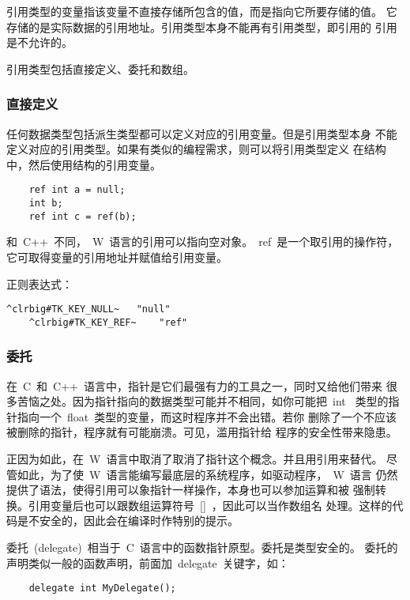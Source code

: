 引用类型的变量指该变量不直接存储所包含的值，而是指向它所要存储的值。
它存储的是实际数据的引用地址。引用类型本身不能再有引用类型，即引用的
引用是不允许的。

引用类型包括直接定义、委托和数组。

\subsubsection{直接定义}

任何数据类型包括派生类型都可以定义对应的引用变量。但是引用类型本身
不能定义对应的引用类型。如果有类似的编程需求，则可以将引用类型定义
在结构中，然后使用结构的引用变量。

\ttfamily
\begin{lstlisting}
    ref int a = null;
    int b;
    ref int c = ref(b);
\end{lstlisting}

和~C++~不同，~W~语言的引用可以指向空对象。~ref~是一个取引用的操作符，
它可取得变量的引用地址并赋值给引用变量。

正则表达式：

\begin{Verbatim}[frame=single, commandchars=^\#\~]
    ^clrbig#TK_KEY_NULL~   "null"
    ^clrbig#TK_KEY_REF~    "ref"
\end{Verbatim}

\subsubsection{委托}

在~C~和~C++~语言中，指针是它们最强有力的工具之一，同时又给他们带来
很多苦恼之处。因为指针指向的数据类型可能并不相同，如你可能把~int~
类型的指针指向一个~float~类型的变量，而这时程序并不会出错。若你
删除了一个不应该被删除的指针，程序就有可能崩溃。可见，滥用指针给
程序的安全性带来隐患。

正因为如此，在~W~语言中取消了取消了指针这个概念。并且用引用来替代。
尽管如此，为了使~W~语言能编写最底层的系统程序，如驱动程序，~W~语言
仍然提供了语法，使得引用可以象指针一样操作，本身也可以参加运算和被
强制转换。引用变量后也可以跟数组运算符号~[]~，因此可以当作数组名
处理。这样的代码是不安全的，因此会在编译时作特别的提示。

委托~(delegate)~相当于~C~语言中的函数指针原型。委托是类型安全的。
委托的声明类似一般的函数声明，前面加~delegate~关键字，如：

\ttfamily
\begin{lstlisting}
    delegate int MyDelegate();
\end{lstlisting}

